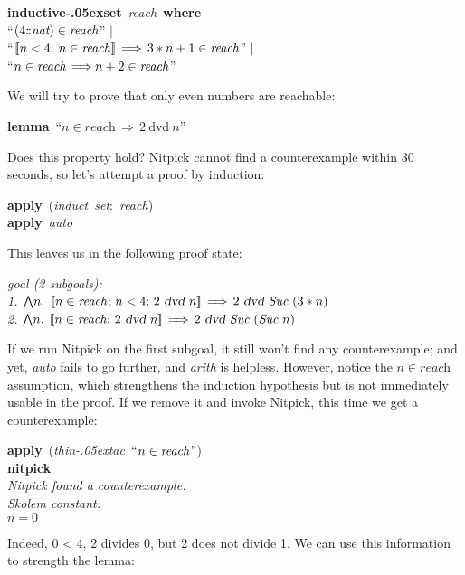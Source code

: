 \documentclass[a4paper,12pt]{article}
\def\Colon{\mathord{:\mkern-1.5mu:}}
\renewcommand\_{\hbox{\textunderscore\kern-.05ex}}
\begin{document}
\prew
\textbf{inductive\_set}~\textit{reach}~\textbf{where} \\
``$(4\Colon\textit{nat}) \in \textit{reach\/}$'' $\mid$ \\
``$\mathopen{[\![} n < 4;\> n \in \textit{reach\/}\mathclose{]\!]} \,\Longrightarrow\, 3 * n + 1 \in \textit{reach\/}$'' $\mid$ \\
``$n \in \textit{reach} \,\Longrightarrow n + 2 \in \textit{reach\/}$''
\postw

We will try to prove that only even numbers are reachable:

\prew
\textbf{lemma}~``$n \in \textit{reach} \,\Longrightarrow\, 2~\textrm{dvd}~n$''
\postw

Does this property hold? Nitpick cannot find a counterexample within 30 seconds,
so let's attempt a proof by induction:

\prew
\textbf{apply}~(\textit{induct~set}{:}~\textit{reach\/}) \\
\textbf{apply}~\textit{auto}
\postw

This leaves us in the following proof state:

\prew
{\slshape goal (2 subgoals): \\
\phantom{0}1. ${\bigwedge}n.\;\, \mathopen{[\![} n \in \textit{reach\/};\, n < 4;\, 2~\textsl{dvd}~n\mathclose{]\!]} \,\Longrightarrow\, 2~\textsl{dvd}~\textit{Suc}~(3 * n)$ \\
\phantom{0}2. ${\bigwedge}n.\;\, \mathopen{[\![} n \in \textit{reach\/};\, 2~\textsl{dvd}~n\mathclose{]\!]} \,\Longrightarrow\, 2~\textsl{dvd}~\textit{Suc}~(\textit{Suc}~n)$
}
\postw

If we run Nitpick on the first subgoal, it still won't find any
counterexample; and yet, \textit{auto} fails to go further, and \textit{arith}
is helpless. However, notice the $n \in \textit{reach}$ assumption, which
strengthens the induction hypothesis but is not immediately usable in the proof.
If we remove it and invoke Nitpick, this time we get a counterexample:

\prew
\textbf{apply}~(\textit{thin\_tac}~``$n \in \textit{reach\/}$'') \\
\textbf{nitpick} \\[2\smallskipamount]
\slshape Nitpick found a counterexample: \\[2\smallskipamount]
\hbox{}\qquad Skolem constant: \nopagebreak \\
\hbox{}\qquad\qquad $n = 0$
\postw

Indeed, 0 < 4, 2 divides 0, but 2 does not divide 1. We can use this information
to strength the lemma:
\end{document}
